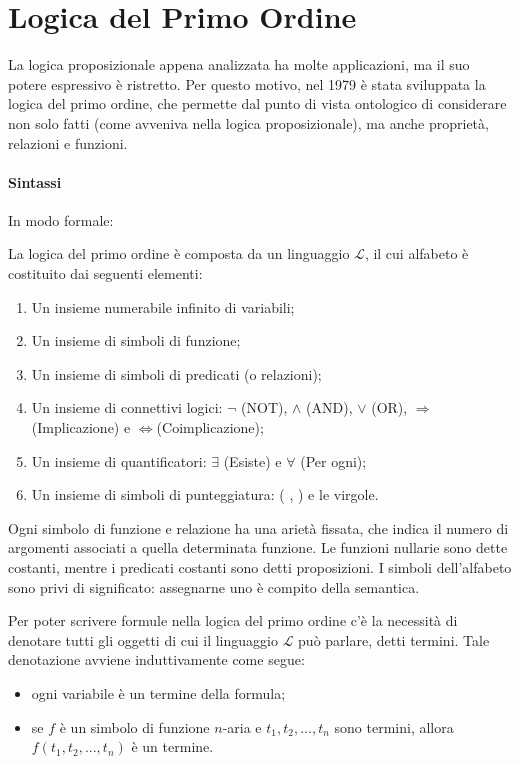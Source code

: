 \section{Logica del Primo Ordine}
La logica proposizionale appena analizzata ha molte applicazioni, ma il suo potere espressivo è ristretto. Per questo motivo, nel 1979 è stata sviluppata  la logica del primo ordine, che permette dal punto di vista ontologico di considerare non solo fatti (come avveniva nella logica proposizionale), ma anche proprietà, relazioni e funzioni. 

\paragraph*{Sintassi}
In modo formale:
\begin{definition}
  La logica del primo ordine è composta da un linguaggio \(\mathcal L\), il cui alfabeto è costituito dai seguenti elementi:
  \begin{enumerate}
    \item Un insieme numerabile infinito di variabili;
    \item Un insieme di simboli di funzione;
    \item Un insieme di simboli di predicati (o relazioni);
    \item Un insieme di connettivi logici: \(\lnot\) (NOT), \(\wedge\) (AND), \(\vee\) (OR), \(\Rightarrow\) (Implicazione) e \(\Leftrightarrow \)(Coimplicazione);
    \item Un insieme di quantificatori: \(\exists\) (Esiste) e \(\forall\) (Per ogni);
    \item Un insieme di simboli di punteggiatura: ( , ) e le virgole.
  \end{enumerate}
  Ogni simbolo di funzione e relazione ha una arietà fissata, che indica il numero di argomenti associati a quella determinata funzione. Le funzioni nullarie sono dette costanti, mentre i predicati costanti sono detti proposizioni. I simboli dell'alfabeto sono privi di significato: assegnarne uno è compito della semantica.
\end{definition}

Per poter scrivere formule nella logica del primo ordine c'è la necessità di denotare tutti gli oggetti di cui il linguaggio \(\mathcal L\) può parlare, detti termini. Tale denotazione avviene induttivamente come segue:
\begin{itemize}
  \item ogni variabile è un termine della formula;
  \item se \(f\) è un simbolo di funzione \(n\)-aria e \(t_1, t_2, ..., t_n\) sono termini, allora \(f(t_1, t_2,...,t_n)\) è un termine.
\end{itemize}

